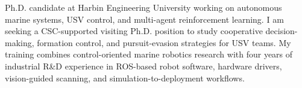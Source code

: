 

\begin{cvparagraph}

Ph.D. candidate at Harbin Engineering University working on autonomous marine systems, USV control, and multi-agent reinforcement learning. I am seeking a CSC-supported visiting Ph.D. position to study cooperative decision-making, formation control, and pursuit-evasion strategies for USV teams. My training combines control-oriented marine robotics research with four years of industrial R\&D experience in ROS-based robot software, hardware drivers, vision-guided scanning, and simulation-to-deployment workflows.
\end{cvparagraph}

